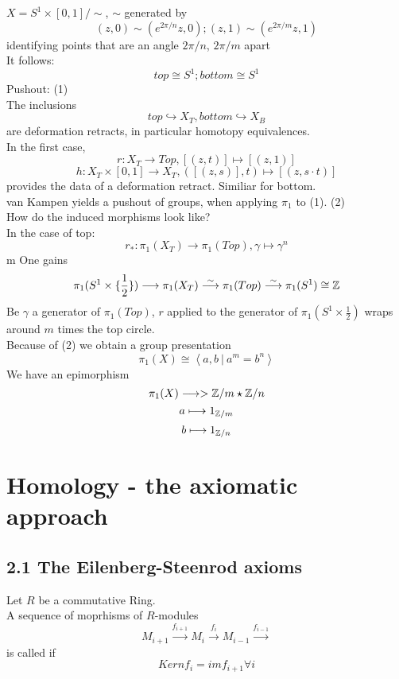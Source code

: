 \Bsp{}
$X = S^1\times [0,1]/\sim$, $\sim$ generated by
\[(z,0) \sim (e^{2\pi /n}z,0) ; (z,1) \sim (e^{2\pi /m}z,1) \]
identifying points that are  an angle $2\pi /n$, $2\pi/m$ apart\\
It follows:
\[top \cong S^1; bottom \cong S^1 \]
Pushout: (1)\\

The inclusions
\[top \hookrightarrow X_{T}, bottom \hookrightarrow X_B \]
are deformation retracts, in particular homotopy equivalences.\\

In the first case,
\[r: X_T \longrightarrow Top, [(z,t)] \longmapsto [(z,1)]\]
\[h: X_T\times [0,1]\longrightarrow X_T, ([(z,s)],t) \longmapsto [(z,s\cdot t)] \]
provides the data of a deformation retract. Similiar for bottom.\\

van Kampen yields a pushout of groups, when applying $\pi_1$ to (1).
(2)\\

How do the induced morphisms look like?\\
In the case of top:
\[r_* : \pi_1(X_T) \longrightarrow \pi_1(Top), \gamma \longmapsto \gamma^n \]m
One gains
\[\pi_1(S^1\times \{\frac{1}{2}\}) \longrightarrow \pi_1(X_T) \overset{\sim}{\longrightarrow} \pi_1(Top) \overset{\sim}{\longrightarrow} \pi_1(S^1) \cong \mathbb{Z}  \]
Be $\gamma$ a generator of $\pi_1(Top)$, $r$ applied to the generator of $\pi_1(S^1\times \frac{1}{2})$ wraps around $m$ times the top circle.\\

Because of (2) we obtain a group presentation
\[\pi_1(X) \cong \left\langle a,b~|~a^m = b^n \right\rangle \]
We have an epimorphism
\[\pi_1(X) \longrightarrow > \mathbb{Z}/m \star \mathbb{Z} /n \]
\[a \longmapsto 1_{\mathbb{Z}/m}\]
\[b \longmapsto 1_{\mathbb{Z}/n}\]

\newpage

\chapter{Homology - the axiomatic approach}

\section{2.1 The Eilenberg-Steenrod axioms}
Let $R$ be a commutative Ring.\\

A sequence of moprhisms of $R$-modules
\[M_{i+1} \overset{f_{i+1}}{\longrightarrow} M_i \overset{f_{i}}{\longrightarrow} M_{i-1} \overset{f_{i-1}}{\longrightarrow}\]
is called  if
\[Kern f_i = im f_{i+1} \forall i\]

